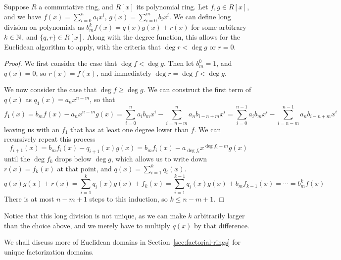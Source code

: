\begin{proposition}\label{prop:ring-polynomial-long-div}
    Suppose \(R\) a commutative ring,
    and \(R[x]\) its polynomial ring.
    Let \(f,g \in R[x]\),
    and we have \(f(x) = \sum_{i=0}^n a_i x^i\),
    \(g(x) = \sum_{i=0}^m b_i x^i\).
    We can define long division on polynomials as
    \(b_m^k f(x) = q(x)g(x) + r(x)\)
    for some arbitrary \(k \in \mathbb{N}\), and \(\{q,r\} \in R[x]\).
    Along with the degree function,
    this allows for the Euclidean algorithm to apply,
    with the criteria that \(\deg r < \deg g\) or \(r = 0\).
\end{proposition}
\begin{proof}
    We first consider the case that \(\deg f < \deg g\).
    Then let \(b_m^0 = 1\), and \(q(x) = 0\),
    so \(r(x) = f(x)\), and immediately \(\deg r = \deg f < \deg g\).

    We now consider the case that \(\deg f \geq \deg g\).
    We can construct the first term of \(q(x)\) as \(q_1(x) = a_n x^{n-m}\),
    so that
    \begin{equation*}
        f_1(x) = b_m f(x) - a_n x^{n-m} g(x)
        = \sum_{i=0}^n a_i b_m x^i - \sum_{i=n-m}^n a_n b_{i-n+m} x^i
        = \sum_{i=0}^{n-1} a_i b_m x^i - \sum_{i=n-m}^{n-1} a_n b_{i-n+m} x^i
    \end{equation*}
    leaving us with an \(f_1\) that has at least one degree lower than \(f\).
    We can recursively repeat this process
    \begin{equation*}
        f_{i+1}(x) = b_m f_i(x) - q_{i+1}(x)g(x)
        = b_m f_i(x) - a_{\deg f_i} x^{\deg f_i - m} g(x)
    \end{equation*}
    until the \(\deg f_k\) drops below \(\deg g\),
    which allows us to write down \(r(x) = f_k(x)\) at that point,
    and \(q(x) = \sum_{i=1}^k q_i(x)\).
    \begin{equation*}
        q(x)g(x) + r(x) = \sum_{i=1}^k q_i(x)g(x) + f_k(x)
        = \sum_{i=1}^{k-1} q_i(x)g(x) + b_m f_{k-1}(x)
        = \cdots = b_m^k f(x)
    \end{equation*}
    There is at most \(n-m+1\) steps to this induction,
    so \(k \leq n-m+1\).
\end{proof}
\begin{remark}
    Notice that this long division is not unique,
    as we can make \(k\) arbitrarily larger than the choice above,
    and we merely have to multiply \(q(x)\) by that difference.
\end{remark}
\begin{remark}
    We shall discuss more of Euclidean domains
    in Section~\ref{sec:factorial-rings} for unique factorization domains.
\end{remark}

